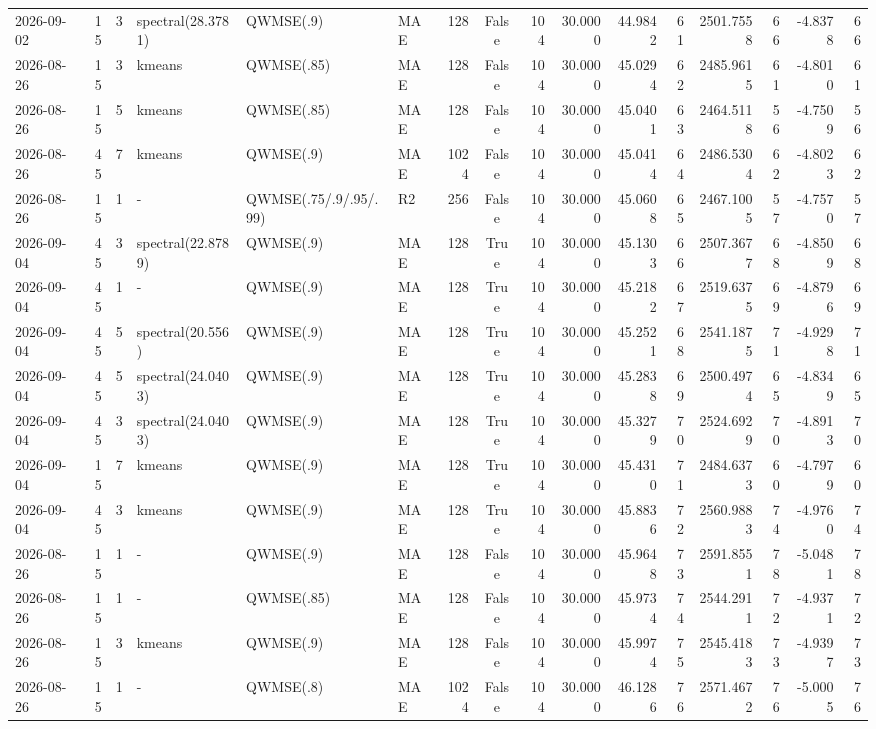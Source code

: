 \documentclass[10pt]{article}
\begin{document}
\begin{landscape}
\begin{longtable}{@{}lrrlllrcrrrrrrrr@{}}
2026-09-02 & 15 & 3 & spectral(28.3781) & QWMSE(.9) & MAE & 128 & False & 104 & 30.0000 & 44.9842 & 61 & 2501.7558 & 66 & -4.8378 & 66 \\
2026-08-26 & 15 & 3 & kmeans & QWMSE(.85) & MAE & 128 & False & 104 & 30.0000 & 45.0294 & 62 & 2485.9615 & 61 & -4.8010 & 61 \\
2026-08-26 & 15 & 5 & kmeans & QWMSE(.85) & MAE & 128 & False & 104 & 30.0000 & 45.0401 & 63 & 2464.5118 & 56 & -4.7509 & 56 \\
2026-08-26 & 45 & 7 & kmeans & QWMSE(.9) & MAE & 1024 & False & 104 & 30.0000 & 45.0414 & 64 & 2486.5304 & 62 & -4.8023 & 62 \\
2026-08-26 & 15 & 1 & - & QWMSE(.75/.9/.95/.99) & R2 & 256 & False & 104 & 30.0000 & 45.0608 & 65 & 2467.1005 & 57 & -4.7570 & 57 \\
2026-09-04 & 45 & 3 & spectral(22.8789) & QWMSE(.9) & MAE & 128 & True & 104 & 30.0000 & 45.1303 & 66 & 2507.3677 & 68 & -4.8509 & 68 \\
2026-09-04 & 45 & 1 & - & QWMSE(.9) & MAE & 128 & True & 104 & 30.0000 & 45.2182 & 67 & 2519.6375 & 69 & -4.8796 & 69 \\
2026-09-04 & 45 & 5 & spectral(20.556) & QWMSE(.9) & MAE & 128 & True & 104 & 30.0000 & 45.2521 & 68 & 2541.1875 & 71 & -4.9298 & 71 \\
2026-09-04 & 45 & 5 & spectral(24.0403) & QWMSE(.9) & MAE & 128 & True & 104 & 30.0000 & 45.2838 & 69 & 2500.4974 & 65 & -4.8349 & 65 \\
2026-09-04 & 45 & 3 & spectral(24.0403) & QWMSE(.9) & MAE & 128 & True & 104 & 30.0000 & 45.3279 & 70 & 2524.6929 & 70 & -4.8913 & 70 \\
2026-09-04 & 15 & 7 & kmeans & QWMSE(.9) & MAE & 128 & True & 104 & 30.0000 & 45.4310 & 71 & 2484.6373 & 60 & -4.7979 & 60 \\
2026-09-04 & 45 & 3 & kmeans & QWMSE(.9) & MAE & 128 & True & 104 & 30.0000 & 45.8836 & 72 & 2560.9883 & 74 & -4.9760 & 74 \\
2026-08-26 & 15 & 1 & - & QWMSE(.9) & MAE & 128 & False & 104 & 30.0000 & 45.9648 & 73 & 2591.8551 & 78 & -5.0481 & 78 \\
2026-08-26 & 15 & 1 & - & QWMSE(.85) & MAE & 128 & False & 104 & 30.0000 & 45.9734 & 74 & 2544.2911 & 72 & -4.9371 & 72 \\
2026-08-26 & 15 & 3 & kmeans & QWMSE(.9) & MAE & 128 & False & 104 & 30.0000 & 45.9974 & 75 & 2545.4183 & 73 & -4.9397 & 73 \\
2026-08-26 & 15 & 1 & - & QWMSE(.8) & MAE & 1024 & False & 104 & 30.0000 & 46.1286 & 76 & 2571.4672 & 76 & -5.0005 & 76 \\

\end{longtable}
\end{landscape}
\end{document}
